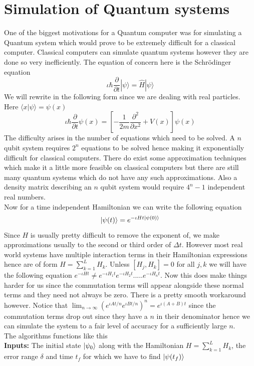 \documentclass{report}
\begin{document}
\section{Simulation of Quantum systems}
One of the biggest motivations for a Quantum computer was for simulating a Quantum system which would prove to be extremely difficult for a classical computer. Classical computers can simulate quantum systems however they are done so very inefficiently. The equation of concern here is the Schrödinger equation
$$\iota\hbar {\frac{\partial}{\partial t}}|\psi\rangle = {\hat{H}}|\psi\rangle$$
We will rewrite in the following form since we are dealing with real particles. Here $\langle{x}|\psi\rangle = \psi(x)$
$$\iota\hbar{\frac{\partial}{\partial t}}\psi(x) = \left[-\dfrac{1}{2m}{\frac{\partial^2}{\partial x^2}} + V(x) \right]\psi(x)$$
The difficulty arises in the number of equations which need to be solved. A $n$ qubit system requires $2^n$ equations to be solved hence making it exponentially difficult for classical computers. There do exist some approximation techniques which make it a little more feasible on classical computers but there are still many quantum systems which do not have any such approximations. Also a density matrix describing an $n$ qubit system would require $4^n - 1$ independent real numbers.\\
Now for a time independent Hamiltonian we can write the following equation
$$\ket{\psi(t)} = e^{-\iota{Ht}\ket{\psi(0)}}$$
Since $H$ is usually pretty difficult to remove the exponent of, we make approximations usually to the second or third order of $\Delta{t}$. However most real world systems have multiple interaction terms in their Hamiltonian expressions hence are of form $H = \sum_{k = 1}^{L}H_{k}$. Unless $[H_{j},H_{k}] = 0$ for all $j,k$ we will have the following equation $e^{-\iota{Ht}} \neq e^{-\iota{H_{1}t}}e^{-\iota{H_{2}t}}.....e^{-\iota{H_{n}t}}$. Now this does make things harder for us since the commutation terms will appear alongside these normal terms and they need not always be zero. There is a pretty smooth workaround however. Notice that $\lim_{n\to\infty}(e^{\iota{At/n}}e^{\iota{Bt/n}})^n = e^{\iota(A + B)t}$ since the commutation terms drop out since they have a $n$ in their denominator hence we can simulate the system to a fair level of accuracy for a sufficiently large $n$.\\
The algorithms functions like this\\
\textbf{Inputs: }The initial state $\ket{\psi_0}$ along with the Hamiltonian $H = \sum_{k = 1}^{L}H_{k}$, the error range $\delta$ and time $t_f$ for which we have to find $\ket{\psi(t_f)}$\\
\end{document}
